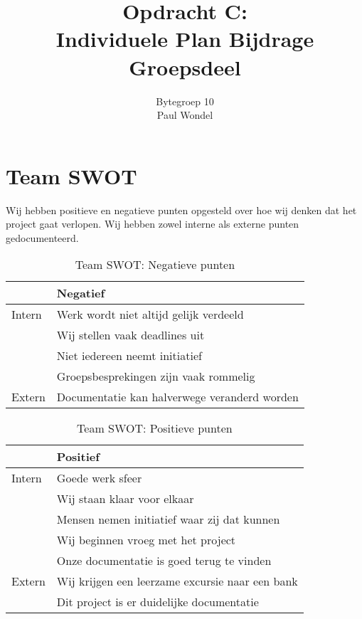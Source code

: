 \documentclass{article}
\title{Opdracht C:\\
	Individuele Plan Bijdrage Groepsdeel}
\author{Bytegroep 10\\
	Paul Wondel}
\begin{document}
\maketitle
\newpage

\tableofcontents

\newpage

\section{Team SWOT}

Wij hebben positieve en negatieve punten opgesteld over hoe wij denken dat het project gaat verlopen.
Wij hebben zowel interne als externe punten gedocumenteerd.

\vspace{5mm}

\begin{table}[h!]
\caption{Team SWOT: Negatieve punten}
\label{tab: Negatieve punten}
\begin{tabular}{l|l}
        & \textbf{Negatief}\\
        \hline
        {Intern} 	& Werk wordt niet altijd gelijk verdeeld \\
			& Wij stellen vaak deadlines uit \\
			& Niet iedereen neemt initiatief \\
			& Groepsbesprekingen zijn vaak rommelig \\
	\hline
        {Extern}	& Documentatie kan halverwege veranderd worden\\
\end{tabular}
\end{table}

\begin{table}[h!]
\caption{Team SWOT: Positieve punten}
\label{tab: Positieve punten}
\begin{tabular}{l|l}
        & \textbf{Positief} \\
        \hline
        {Intern} 	& Goede werk sfeer \\ 
			& Wij staan klaar voor elkaar \\
			& Mensen nemen initiatief waar zij dat kunnen \\
			& Wij beginnen vroeg met het project \\
			& Onze documentatie is goed terug te vinden \\
	\hline
        {Extern}	& Wij krijgen een leerzame excursie naar een bank \\
			& Dit project is er duidelijke documentatie \\	
\end{tabular}
\end{table}
\end{document}
